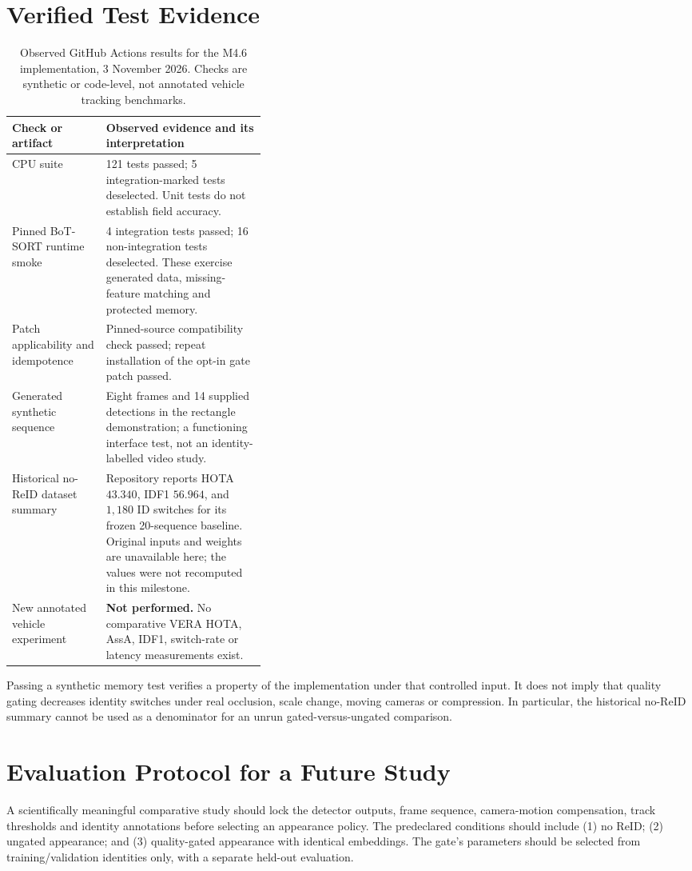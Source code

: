 \documentclass[11pt,a4paper]{article}
\begin{document}
\section{Verified Test Evidence}
\begin{table}[htbp]
\centering\small
\caption{Observed GitHub Actions results for the M4.6 implementation, 3 November 2026. Checks are synthetic or code-level, not annotated vehicle tracking benchmarks.}
\begin{tabularx}{\linewidth}{@{}p{0.37\linewidth}X@{}}
\toprule
\textbf{Check or artifact} & \textbf{Observed evidence and its interpretation} \\
\midrule
CPU suite & 121 tests passed; 5 integration-marked tests deselected. Unit tests do not establish field accuracy. \\
Pinned BoT-SORT runtime smoke & 4 integration tests passed; 16 non-integration tests deselected. These exercise generated data, missing-feature matching and protected memory. \\
Patch applicability and idempotence & Pinned-source compatibility check passed; repeat installation of the opt-in gate patch passed. \\
Generated synthetic sequence & Eight frames and 14 supplied detections in the rectangle demonstration; a functioning interface test, not an identity-labelled video study. \\
Historical no-ReID dataset summary & Repository reports HOTA $43.340$, IDF1 $56.964$, and $1{,}180$ ID switches for its frozen 20-sequence baseline. Original inputs and weights are unavailable here; the values were not recomputed in this milestone. \\
New annotated vehicle experiment & \textbf{Not performed.} No comparative VERA HOTA, AssA, IDF1, switch-rate or latency measurements exist. \\
\bottomrule
\end{tabularx}
\label{tab:evidence}
\end{table}

Passing a synthetic memory test verifies a property of the implementation under that controlled input. It does not imply that quality gating decreases identity switches under real occlusion, scale change, moving cameras or compression. In particular, the historical no-ReID summary cannot be used as a denominator for an unrun gated-versus-ungated comparison.

\section{Evaluation Protocol for a Future Study}
A scientifically meaningful comparative study should lock the detector outputs, frame sequence, camera-motion compensation, track thresholds and identity annotations before selecting an appearance policy. The predeclared conditions should include (1) no ReID; (2) ungated appearance; and (3) quality-gated appearance with identical embeddings. The gate's parameters should be selected from training/validation identities only, with a separate held-out evaluation.
\end{document}
